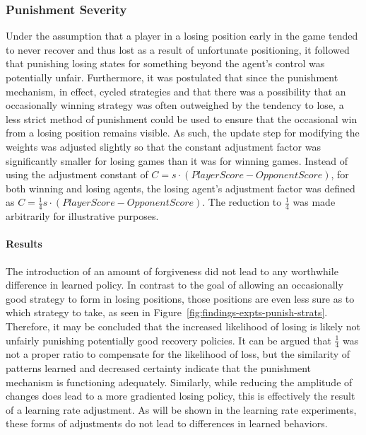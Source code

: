 
\subsubsection*{Punishment Severity}
\label{sec:findings-expts-punishments}

Under the assumption that a player in a losing position
early in the game tended to never recover and thus lost as a result of
unfortunate positioning,
it followed that punishing losing states for something beyond the agent's
control was potentially unfair.
%
Furthermore,
it was postulated that since the punishment mechanism, in effect, cycled
strategies
and that there was a possibility that an occasionally winning strategy was often
outweighed by the tendency to lose,
a less strict method of punishment could be used to ensure that the occasional
win from a losing position remains visible.
%
As such,
the update step for modifying the weights was adjusted slightly
so that the constant adjustment factor was significantly smaller for losing
games than it was for winning games.
%
Instead of using the adjustment constant of
$C = s \cdot (\textit{PlayerScore} - \textit{OpponentScore})$,
for both winning and losing agents,
the losing agent's adjustment factor was defined as
$C = \frac{1}{4} s \cdot (\textit{PlayerScore} - \textit{OpponentScore})$.
%
The reduction to $\frac{1}{4}$ was made arbitrarily for illustrative purposes.

\paragraph*{Results}

The introduction of an amount of forgiveness did not lead to any worthwhile
difference in learned policy.
%
In contrast to the goal of allowing an occasionally good strategy to form
in losing positions,
those positions are even less sure as to which strategy to take,
as seen in Figure~\ref{fig:findings-expts-punish-strats}.
%
Therefore,
it may be concluded that the increased likelihood of losing is 
likely not unfairly punishing potentially good recovery policies.
%
It can be argued that $\frac{1}{4}$ was not a proper ratio
to compensate for the likelihood of loss,
but the similarity of patterns learned and decreased certainty
indicate that the punishment mechanism is functioning adequately.
%
Similarly,
while reducing the amplitude of changes
does lead to a more gradiented losing policy,
this is effectively the result of a learning rate adjustment.
%
As will be shown in the learning rate experiments,
these forms of adjustments do not lead to differences in learned behaviors.



